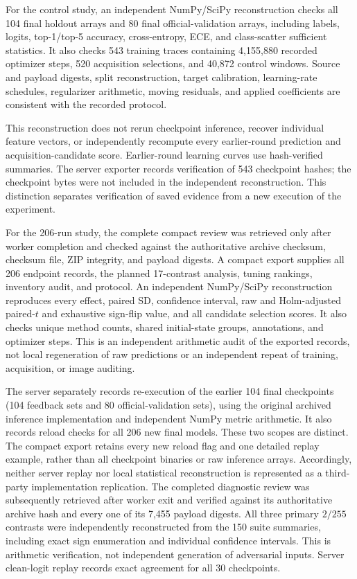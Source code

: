 \documentclass[10pt,a4paper,twocolumn]{article}
\begin{document}
For the control study, an independent NumPy/SciPy reconstruction checks
all 104 final holdout arrays and 80 final official-validation arrays,
including labels, logits, top-1/top-5 accuracy, cross-entropy, ECE, and
class-scatter sufficient statistics. It also checks 543 training traces
containing 4,155,880 recorded optimizer steps, 520 acquisition selections,
and 40,872 control windows. Source and payload digests, split
reconstruction, target calibration, learning-rate schedules, regularizer
arithmetic, moving residuals, and applied coefficients are consistent
with the recorded protocol.

This reconstruction does not rerun checkpoint inference, recover
individual feature vectors, or independently recompute every earlier-round
prediction and acquisition-candidate score. Earlier-round learning
curves use hash-verified summaries. The server exporter records
verification of 543 checkpoint hashes; the checkpoint bytes were not
included in the independent reconstruction. This distinction separates
verification of saved evidence from a new execution of the experiment.

For the 206-run study, the complete compact review was retrieved only
after worker completion and checked against the authoritative archive
checksum, checksum file, ZIP integrity, and payload digests. A compact
export supplies all 206 endpoint records, the planned 17-contrast
analysis, tuning rankings, inventory audit, and protocol. An independent
NumPy/SciPy reconstruction reproduces every effect, paired SD, confidence
interval, raw and Holm-adjusted paired-$t$ and exhaustive sign-flip
value, and all candidate selection scores. It also checks unique
method counts, shared initial-state groups, annotations, and optimizer
steps. This is an independent arithmetic audit of the exported records,
not local regeneration of raw predictions or an independent repeat of
training, acquisition, or image auditing.

The server separately records re-execution of the earlier 104 final
checkpoints (104 feedback sets and 80 official-validation sets), using
the original archived inference implementation and independent NumPy
metric arithmetic. It also records reload checks for all 206 new final
models. These two scopes are distinct. The compact export retains every
new reload flag and one detailed replay example, rather than all
checkpoint binaries or raw inference arrays. Accordingly, neither
server replay nor local statistical reconstruction is represented as a
third-party implementation replication. The completed diagnostic review
was subsequently retrieved after worker exit and verified against its
authoritative archive hash and every one of its 7,455 payload digests.
All three primary $2/255$ contrasts were independently reconstructed
from the 150 suite summaries, including exact sign enumeration and
individual confidence intervals. This is arithmetic verification, not
independent generation of adversarial inputs. Server clean-logit replay
records exact agreement for all 30 checkpoints.
\end{document}
